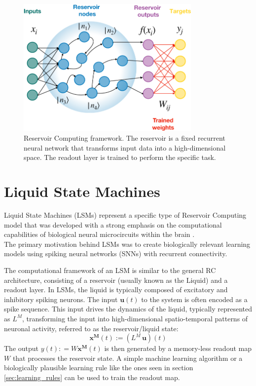 \documentclass[a4paper,12pt]{report}
\begin{document}
\begin{figure}[h!]
    \centering
    \includegraphics[width=0.8\textwidth]{pictures/RC_picture.png}
    \caption{Reservoir Computing framework. The reservoir is a fixed recurrent neural 
    network that transforms input data into a high-dimensional space. The readout layer 
    is trained to perform the specific task.}
    \label{fig:rc_framework}
\end{figure}

\section{Liquid State Machines}
Liquid State Machines (LSMs) represent a specific type of Reservoir Computing model that 
was developed with a strong emphasis on the computational capabilities of biological 
neural microcircuits within the brain \cite{Maass2002, Maass2004, Maass2011}.\\
The primary motivation behind LSMs was to create biologically relevant learning models 
using spiking neural networks (SNNs) with recurrent connectivity.

The computational framework of an LSM is similar to the general RC architecture, 
consisting of a reservoir (usually known as the Liquid) and a readout layer. In LSMs, 
the liquid is typically composed of excitatory and inhibitory spiking neurons. 
The input $\mathbf{u}(t)$ to the system is often encoded as a spike sequence. This input drives the 
dynamics of the liquid, typically represented as $L^M$, transforming the input into high-dimensional 
spatio-temporal patterns of neuronal activity, referred to as the reservoir/liquid state: 
$$ \mathbf{x^M}(t) := (L^M\,\mathbf{u})(t)$$ 
The output $ y(t) : = W\mathbf{x^M}(t)$ is then generated by a memory-less readout map $W$ 
that processes the reservoir state. 
A simple machine learning algorithm or a biologically plausible learning rule like the 
ones seen in section \ref{sec:learning_rules} can be used to train the readout map.
\end{document}

